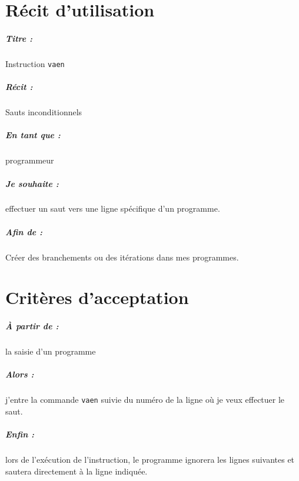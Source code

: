 \documentclass[12pt,a5paper, notitle, oneside]{report}
\begin{document}
    \chapter*{Récit d'utilisation}

    \paragraph{Titre : } Instruction \verb|vaen|
    \paragraph{Récit : } Sauts inconditionnels
    \paragraph{En tant que : } programmeur
    \paragraph{Je souhaite : } effectuer un saut vers une ligne
        spécifique d'un programme.
    \paragraph{Afin de : } Créer des branchements ou des itérations
        dans mes programmes.
    \newpage

    \chapter*{Critères d'acceptation}

    \paragraph{À partir de : } la saisie d'un programme
    \paragraph{Alors : } j'entre la commande \verb|vaen| suivie du numéro
        de la ligne où je veux effectuer le saut.
    \paragraph{Enfin : } lors de l'exécution de l'instruction, le programme
        ignorera les lignes suivantes et sautera directement à la ligne
        indiquée.
\end{document}
